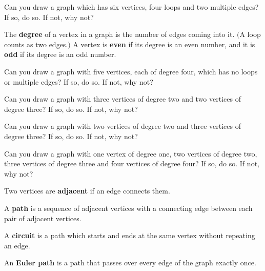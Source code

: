 \begin{prb}
Can you draw a graph which has six vertices, four loops and two multiple edges? If so, do so.  If not, why not?
\end{prb}

\begin{dfn}
The \textbf{degree} of a vertex in a graph is the number of edges coming into it.  $($A loop counts as two edges.$)$  A vertex is \textbf{even} if its degree is an even number, and it is \textbf{odd} if its degree is an odd number.
\end{dfn}

\begin{prb}
Can you draw a graph with five vertices, each of degree four, which has no loops or multiple edges? If so, do so.  If not, why not?
\end{prb}

\begin{prb}
Can you draw a graph with three vertices of degree two and two vertices of degree three? If so, do so.  If not, why not?
\end{prb}

\begin{prb}
Can you draw a graph with two vertices of degree two and three vertices of degree three? If so, do so.  If not, why not?
\end{prb}

\begin{prb}
Can you draw a graph with one vertex of degree one, two vertices of degree two, three vertices of degree three and four vertices
of degree four? If so, do so.  If not, why not?
\end{prb}

\begin{dfn}
Two vertices are \textbf{adjacent} if an edge connects them.
\end{dfn}

\begin{dfn}
A \textbf{path} is a sequence of adjacent vertices with a connecting edge between each pair of adjacent vertices.
\end{dfn}

\begin{dfn}
A \textbf{circuit} is a path which starts and ends at the same vertex without repeating an edge.
\end{dfn}

\begin{dfn}
An \textbf{Euler path} is a path that passes over every edge of the graph exactly once.
\end{dfn}

